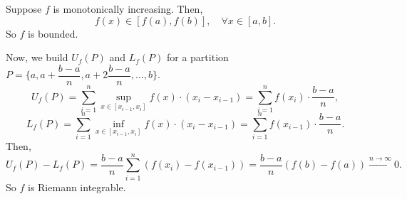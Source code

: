 \documentclass[11pt]{article}
\begin{document}
Suppose \(f\) is monotonically increasing. Then,
\[f(x) \in [f(a), f(b)], \quad \forall x \in [a,b].\]
So \(f\) is bounded.

Now, we build $U_f(P)$ and $L_f(P)$ for a partition $P = \{a, a + \dfrac{b-a}{n}, a + 2\dfrac{b-a}{n}, \ldots, b\}$.
\[U_f(P) = \sum_{i=1}^{n} \sup_{x \in [x_{i-1}, x_i]} f(x) \cdot (x_i - x_{i-1}) = \sum_{i=1}^{n} f(x_i) \cdot \dfrac{b-a}{n},\]
\[L_f(P) = \sum_{i=1}^{n} \inf_{x \in [x_{i-1}, x_i]} f(x) \cdot (x_i - x_{i-1}) = \sum_{i=1}^{n} f(x_{i-1}) \cdot \dfrac{b-a}{n}.\]
Then,
\[U_f(P) - L_f(P) = \dfrac{b-a}{n} \sum_{i=1}^{n} \left(f(x_i) - f(x_{i-1})\right) = \dfrac{b-a}{n} \left(f(b) - f(a)\right) \stackrel{n \to \infty}{\longrightarrow} 0.\]
So \(f\) is Riemann integrable. 
\end{document}
